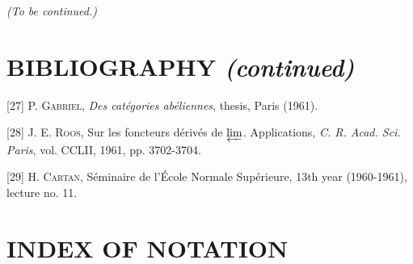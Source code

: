 \begin{flushright}
\emph{(To be continued.)}
\end{flushright}

\clearpage
{}
\thispagestyle{empty}
\null
\clearpage
\thispagestyle{plain}

\section*{BIBLIOGRAPHY \textit{(continued)}}

\begin{flushleft}
[27] P. \textsc{Gabriel}, \emph{Des catégories abéliennes}, thesis, Paris (1961).

\medskip
{}[28] J. E. \textsc{Roos}, Sur les foncteurs dérivés de $\varprojlim$.
Applications, \emph{C. R. Acad. Sci. Paris}, vol. CCLII, 1961, pp. 3702-3704.

\medskip
{}[29] H. \textsc{Cartan}, Séminaire de l'École Normale Supérieure,
13th year (1960-1961), lecture no. 11.
\end{flushleft}

\clearpage
{}
\section*{INDEX OF NOTATION}

